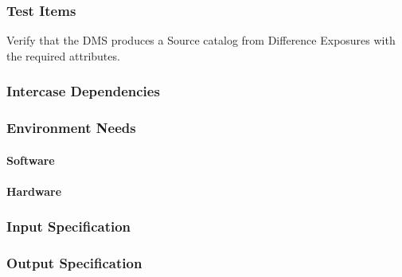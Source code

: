 \subsubsection{Test Items}
Verify that the DMS produces a Source catalog from Difference Exposures
with the required attributes.



\subsubsection{Intercase Dependencies}

\subsubsection{Environment Needs}

\paragraph{Software}

\paragraph{Hardware}

\subsubsection{Input Specification}

\subsubsection{Output Specification}

